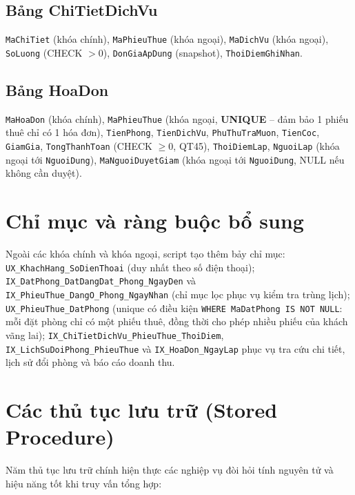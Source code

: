\documentclass[14pt]{report}
\begin{document}
\subsection{Bảng ChiTietDichVu}
\texttt{MaChiTiet} (khóa chính), \texttt{MaPhieuThue} (khóa ngoại), \texttt{MaDichVu} (khóa ngoại), \texttt{SoLuong} (CHECK $>0$), \texttt{DonGiaApDung} (snapshot), \texttt{ThoiDiemGhiNhan}.

\subsection{Bảng HoaDon}
\texttt{MaHoaDon} (khóa chính), \texttt{MaPhieuThue} (khóa ngoại, \textbf{UNIQUE} -- đảm bảo 1 phiếu thuê chỉ có 1 hóa đơn), \texttt{TienPhong}, \texttt{TienDichVu}, \texttt{PhuThuTraMuon}, \texttt{TienCoc}, \texttt{GiamGia}, \texttt{TongThanhToan} (CHECK $\ge 0$, QT45), \texttt{ThoiDiemLap}, \texttt{NguoiLap} (khóa ngoại tới \texttt{NguoiDung}), \texttt{MaNguoiDuyetGiam} (khóa ngoại tới \texttt{NguoiDung}, NULL nếu không cần duyệt).

\section{Chỉ mục và ràng buộc bổ sung}

Ngoài các khóa chính và khóa ngoại, script tạo thêm bảy chỉ mục: \texttt{UX\_KhachHang\_SoDienThoai} (duy nhất theo số điện thoại); \texttt{IX\_DatPhong\_DatDangDat\_Phong\_NgayDen} và \texttt{IX\_PhieuThue\_DangO\_Phong\_NgayNhan} (chỉ mục lọc phục vụ kiểm tra trùng lịch); \texttt{UX\_PhieuThue\_DatPhong} (unique có điều kiện \texttt{WHERE MaDatPhong IS NOT NULL}: mỗi đặt phòng chỉ có một phiếu thuê, đồng thời cho phép nhiều phiếu của khách vãng lai); \texttt{IX\_ChiTietDichVu\_PhieuThue\_ThoiDiem}, \texttt{IX\_LichSuDoiPhong\_PhieuThue} và \texttt{IX\_HoaDon\_NgayLap} phục vụ tra cứu chi tiết, lịch sử đổi phòng và báo cáo doanh thu.

\section{Các thủ tục lưu trữ (Stored Procedure)}

Năm thủ tục lưu trữ chính hiện thực các nghiệp vụ đòi hỏi tính nguyên tử và hiệu năng tốt khi truy vấn tổng hợp:
\end{document}
